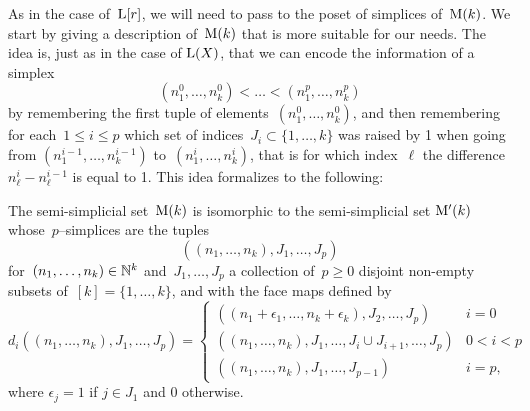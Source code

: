 As in the case of~$\mathrm{L}[r]$, we will need to pass to the poset of simplices of~$\mathrm{M}(k)$. We start by giving a description of~$\mathrm{M}(k)$ that is more suitable for our needs. The idea is, just as in the case of $\mathrm{L}(X)$,  that we can encode the information of a simplex
\[
(n_1^0,\dots,n^0_{k})<\dots <  (n^p_1,\dots,n^p_{k})
\]
by remembering the first tuple of elements~$ (n_1^0,\dots,n^0_{k})$, and then remembering for each~$1\le i\le p$ which set of indices~$J_i\subset \{1,\dots,k\}$ was raised by 1 when going from 
$ (n_1^{i-1},\dots,n^{i-1}_{k})$ to~$ (n_1^i,\dots,n^i_{k})$, that is for which index~$\ell$ the difference~$n_\ell^{i}-n_\ell^{i-1}$ is equal to 1. This idea formalizes to the following:  

\begin{lem}\label{lem:LL'k}
The semi-simplicial set~$\mathrm{M}(k)$ is isomorphic to the semi-simplicial set 
$\mathrm{M}'(k)$ whose~$p$--simplices are the tuples 
$$((n_1,\dots,n_k),J_1,\dots,J_p)$$
for~$(n_1,\dots,n_k)\in \mathbb{N}^k$ and~$J_1,\dots,J_p$ a collection of~$p\ge 0$ disjoint non-empty subsets of~$[k]=\{1,\dots,k\}$, 
and with the face maps defined by 
\[
d_i ((n_1,\dots,n_k),J_1,\dots,J_p)=
\begin{cases}
((n_1+\epsilon_1,\dots,n_k+\epsilon_k),J_2,\dots,J_p) & i=0 \\
((n_1,\dots,n_k),J_1,\dots,J_i\cup J_{i+1},\dots ,J_p) & 0<i<p\\ 
((n_1,\dots,n_k),J_1,\dots,J_{p-1}) & i=p,
\end{cases}
\]
where $\epsilon_j=1$ if $j\in J_1$ and $0$ otherwise.
\end{lem}

